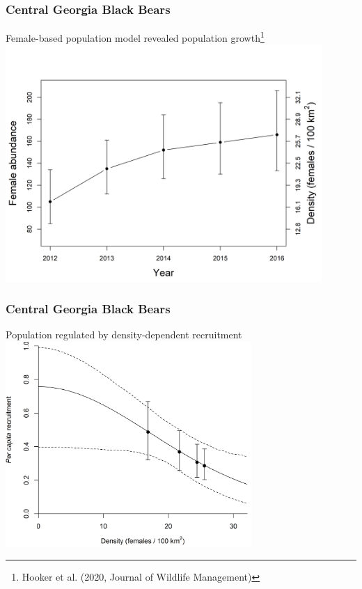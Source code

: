 \documentclass[color=usenames,dvipsnames,handout]{beamer}\usepackage[]{graphicx}\usepackage[]{color}
\begin{document}
\begin{frame}
\begin{columns}
\begin{column}{0.5\textwidth}
    \end{column}
  \end{columns}
\end{frame}



\begin{frame}
  \frametitle{Central Georgia Black Bears}
  Female-based population model revealed population
  growth\footnote{Hooker et al. (2020, Journal of Wildlife Management)} \\
  \vfill
  \centering
  \includegraphics[width=0.9\textwidth]{figs/fig-5_abundance} \\
\end{frame}


\begin{frame}
  \frametitle{Central Georgia Black Bears}
  Population regulated by density-dependent recruitment \\
  \vfill
  \centering
  \includegraphics[width=0.7\textwidth]{figs/fig-3_dd-recruitment} \\
\end{frame}
\end{document}
